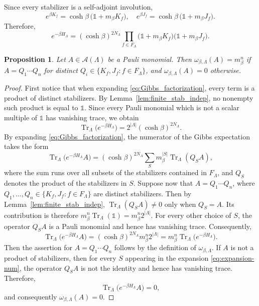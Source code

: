 \documentclass[a4paper,11pt]{article}
\newtheorem{proposition}[theorem]{Proposition}
\theoremstyle{definition}
\theoremstyle{remark}
\theoremstyle{remark}
\begin{document}
Since every stabilizer is a self-adjoint involution,
\[
    e^{\beta K_f} =\cosh\beta\,\bigl(\mathds{1}+m_\beta K_f\bigr),\quad e^{\beta J_f}=\cosh\beta\,\bigl(\mathds{1}+m_\beta J_f\bigr).
\]
Therefore,
\begin{equation}\label{eq:Gibbs_factorization}
    e^{-\beta H_\Lambda}=(\cosh\beta)^{2N_\Lambda}\prod_{f\in F_\Lambda}\bigl(\mathds{1}+m_\beta K_f\bigr)\bigl(\mathds{1}+m_\beta J_f\bigr).
\end{equation}

\begin{proposition}\label{prop:finite_Gibbs_expectation}
    Let $A\in\mathcal A(\Lambda)$ be a Pauli monomial. Then $\omega_{\beta,\Lambda}(A) = m_\beta^n$ if $A=Q_1\cdots Q_n$ for distinct $Q_i\in \{K_f,J_f:f\in F_\Lambda\}$, and $\omega_{\beta,\Lambda}(A) = 0$ otherwise. 
\end{proposition}

\begin{proof}
    First notice that when expanding \eqref{eq:Gibbs_factorization}, every term is a product of distinct stabilizers. By Lemma~\ref{lem:finite_stab_indep}, no nonempty such product is equal to $\mathds{1}$. Since every Pauli monomial which is not a scalar multiple of $\mathds{1}$ has vanishing trace, we obtain
    \[
        \operatorname{Tr}_{\Lambda} \bigl(e^{-\beta H_\Lambda}\bigr) = 2^{|\Lambda|} (\cosh\beta)^{2N_\Lambda}.
    \]
    By expanding \eqref{eq:Gibbs_factorization}, the numerator of the Gibbs expectation takes the form
    \begin{equation} \label{eq:expansion-num}
        \operatorname{Tr}_\Lambda\bigl(e^{-\beta H_\Lambda}A\bigr)
        =
        (\cosh\beta)^{2N_\Lambda}
        \sum_{S}m_\beta^{|S|}
        \operatorname{Tr}_\Lambda(Q_SA),
    \end{equation}
    where the sum runs over all subsets of the stabilizers contained in $F_\Lambda$, and $Q_S$ denotes the product of the stabilizers in $S$. Suppose now that $A=Q_1\cdots Q_n$, where $Q_1,\ldots,Q_n\in\{K_f,J_f:f\in F_\Lambda\}$ are distinct stabilizers. Then by Lemma~\ref{lem:finite_stab_indep}, $\operatorname{Tr}_\Lambda(Q_SA) \neq 0$ only when $Q_S=A$.  Its contribution is therefore $m_\beta^n\operatorname{Tr}_\Lambda(\mathds{1})=m_\beta^n2^{|\Lambda|}$. For every other choice of $S$, the operator $Q_SA$ is a Pauli monomial and hence has vanishing trace. Consequently,
    \[
        \operatorname{Tr}_\Lambda\bigl(e^{-\beta H_\Lambda}A\bigr) = (\cosh\beta)^{2N_\Lambda}m_\beta^n2^{|\Lambda|}= m_\beta^n
        \operatorname{Tr}_\Lambda\bigl(e^{-\beta H_\Lambda}\bigr).
    \]
    Then the assertion for $A=Q_1\cdots Q_n$ follows by the definition of $\omega_{\beta,\Lambda}$. 
    If $A$ is not a product of stabilizers, then for every $S$ appearing in the expansion \eqref{eq:expansion-num}, the operator $Q_SA$ is not the identity and hence has vanishing trace. Therefore,
    \[
        \operatorname{Tr}_\Lambda\bigl(e^{-\beta H_\Lambda}A\bigr)=0,
    \]
    and consequently $\omega_{\beta,\Lambda}(A)=0$.
\end{proof}
\end{document}
